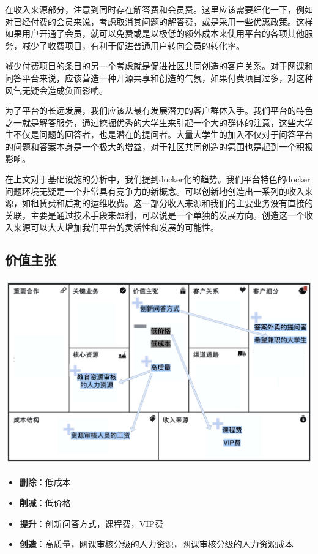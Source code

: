 \documentclass[a4paper]{ctexart}
\begin{document}
在收入来源部分，注意到同时存在解答费和会员费。这里应该需要细化一下，例如对已经付费的会员来说，考虑取消其问题的解答费，或是采用一些优惠政策。这样如果用户开通了会员，就可以免费或是以极低的额外成本来使用平台的各项其他服务，减少了收费项目，有利于促进普通用户转向会员的转化率。

减少付费项目的条目的另一个考虑就是促进社区共同创造的客户关系。对于网课和问答平台来说，应该营造一种开源共享和创造的气氛，如果付费项目过多，对这种风气无疑会造成负面影响。

为了平台的长远发展，我们应该从最有发展潜力的客户群体入手。我们平台的特色之一就是解答服务，通过挖掘优秀的大学生来引起一个大的群体的注意，这些大学生不仅是问题的回答者，也是潜在的提问者。大量大学生的加入不仅对于问答平台的问题和答案本身是一个极大的增益，对于社区共同创造的氛围也是起到一个积极影响。

在上文对于基础设施的分析中，我们提到docker化的趋势。我们平台特色的docker问题环境无疑是一个非常具有竞争力的新概念。可以创新地创造出一系列的收入来源，如租赁费和后期的运维收费。这一部分收入来源和我们的主要业务没有直接的关联，主要是通过技术手段来盈利，可以说是一个单独的发展方向。创造这一个收入来源可以大大增加我们平台的灵活性和发展的可能性。

\subsection{价值主张}
\begin{center}
  \includegraphics[scale=0.3]{价值主张.png}
\end{center}

\begin{itemize}
  \item \textbf{删除}：低成本
  \item \textbf{削减}：低价格
  \item \textbf{提升}：创新问答方式，课程费，VIP费
  \item \textbf{创造}：高质量，网课审核分级的人力资源，网课审核分级的人力资源成本
\end{itemize}
\end{document}
